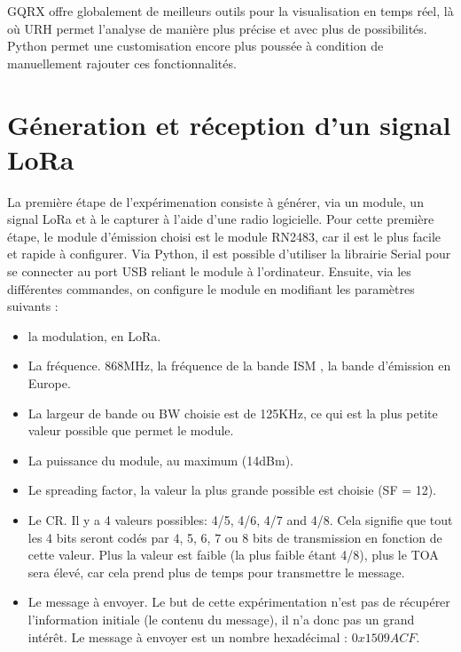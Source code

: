 GQRX offre globalement de meilleurs outils pour la visualisation en temps réel, là où \ac{URH} permet l'analyse de manière plus précise et avec plus de possibilités. Python permet une customisation encore plus poussée à condition de manuellement rajouter ces fonctionnalités.

\newpage

\section{Géneration et réception d'un signal LoRa} \label{signallora}

La première étape de l'expérimenation consiste à générer, via un module, un signal \ac{LoRa} et à le capturer à l'aide d'une radio logicielle. Pour cette première étape, le module d'émission choisi est le module RN2483, car il est le plus facile et rapide à configurer.
Via Python, il est possible d'utiliser la librairie Serial pour se connecter au port \ac{USB} reliant le module à l'ordinateur. Ensuite, via les différentes commandes, on configure le module en modifiant les paramètres suivants : 

\vspace{0.1cm}

\begin{itemize}
\item la modulation, en LoRa.
\item La fréquence. 868MHz, la fréquence de la bande \ac{ISM} , la bande d'émission en Europe.
\item La largeur de bande ou \ac{BW} choisie est de 125KHz, ce qui est la plus petite valeur possible que permet le module.
\item La puissance du module, au maximum (14dBm).
\item Le spreading factor, la valeur la plus grande possible est choisie (SF = 12).
\item Le \ac{CR}. Il y a 4 valeurs possibles: 4/5, 4/6, 4/7 and 4/8. Cela signifie que tout les 4 bits seront codés par 4, 5, 6, 7 ou 8 bits de transmission en fonction de cette valeur. Plus la valeur est faible (la plus faible étant 4/8), plus le \ac{TOA} sera élevé, car cela prend plus de temps pour transmettre le message.
\item Le message à envoyer. Le but de cette expérimentation n'est pas de récupérer l'information initiale (le contenu du message), il n'a donc pas un grand intérêt. Le message à envoyer est un nombre hexadécimal : $0x1509ACF$.
\end{itemize}

